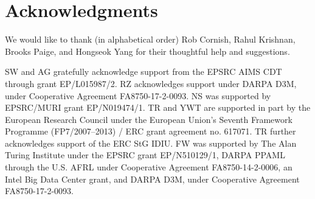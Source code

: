 \section*{Acknowledgments}
We would like to thank (in alphabetical order) Rob Cornish, Rahul Krishnan, Brooks Paige, and Hongseok Yang for their thoughtful help and suggestions.

SW and AG gratefully acknowledge support from the EPSRC AIMS CDT
through grant EP/L015987/2. RZ acknowledges support under DARPA D3M,
under Cooperative Agreement FA8750-17-2-0093. NS was supported by
EPSRC/MURI grant EP/N019474/1. TR and YWT are supported in part by the
European Research Council under the European Union’s Seventh Framework
Programme (FP7/2007–2013) / ERC grant agreement no. 617071. 
TR further acknowledges support of the ERC StG IDIU. FW was
supported by The Alan Turing Institute under the EPSRC grant
EP/N510129/1, DARPA PPAML through the U.S. AFRL under Cooperative
Agreement FA8750-14-2-0006, an Intel Big Data Center grant, and DARPA
D3M, under Cooperative Agreement FA8750-17-2-0093. 
